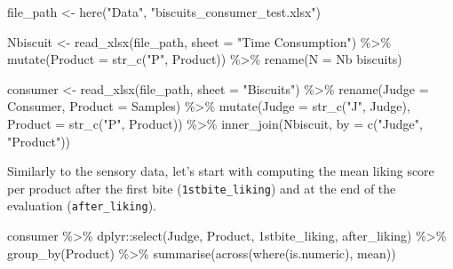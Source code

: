 \documentclass[
]{krantz}
\makeatletter
\newenvironment{Shaded}{\begin{snugshade}}{\end{snugshade}}
\newcommand{\AttributeTok}[1]{\textcolor[rgb]{0.61,0.61,0.61}{#1}}
\newcommand{\FunctionTok}[1]{\textcolor[rgb]{0,0,0}{#1}}
\newcommand{\NormalTok}[1]{#1}
\newcommand{\OtherTok}[1]{\textcolor[rgb]{0.37,0.37,0.37}{#1}}
\newcommand{\SpecialCharTok}[1]{\textcolor[rgb]{0,0,0}{#1}}
\newcommand{\StringTok}[1]{\textcolor[rgb]{0.5,0.5,0.5}{#1}}
\newenvironment{kframe}{%
\medskip{}
\setlength{\fboxsep}{.8em}
 \def\at@end@of@kframe{}%
 \ifinner\ifhmode%
  \def\at@end@of@kframe{\end{minipage}}%
  \begin{minipage}{\columnwidth}%
 \fi\fi%
 \def\FrameCommand##1{\hskip\@totalleftmargin \hskip-\fboxsep
 \colorbox{shadecolor}{##1}\hskip-\fboxsep
     \hskip-\linewidth \hskip-\@totalleftmargin \hskip\columnwidth}%
 \MakeFramed {\advance\hsize-\width
   \@totalleftmargin\z@ \linewidth\hsize
   \@setminipage}}%
 {\par\unskip\endMakeFramed%
 \at@end@of@kframe}
\renewenvironment{Shaded}{\begin{kframe}}{\end{kframe}}
\makeatother
\begin{document}
\begin{Shaded}
\begin{Highlighting}[]
\NormalTok{file\_path }\OtherTok{\textless{}{-}} \FunctionTok{here}\NormalTok{(}\StringTok{"Data"}\NormalTok{, }\StringTok{"biscuits\_consumer\_test.xlsx"}\NormalTok{)}

\NormalTok{Nbiscuit }\OtherTok{\textless{}{-}} \FunctionTok{read\_xlsx}\NormalTok{(file\_path, }\AttributeTok{sheet =} \StringTok{"Time Consumption"}\NormalTok{) }\SpecialCharTok{\%\textgreater{}\%}
  \FunctionTok{mutate}\NormalTok{(}\AttributeTok{Product =} \FunctionTok{str\_c}\NormalTok{(}\StringTok{"P"}\NormalTok{, Product)) }\SpecialCharTok{\%\textgreater{}\%}
  \FunctionTok{rename}\NormalTok{(}\AttributeTok{N =} \StringTok{\textasciigrave{}}\AttributeTok{Nb biscuits}\StringTok{\textasciigrave{}}\NormalTok{)}

\NormalTok{consumer }\OtherTok{\textless{}{-}} \FunctionTok{read\_xlsx}\NormalTok{(file\_path, }\AttributeTok{sheet =} \StringTok{"Biscuits"}\NormalTok{) }\SpecialCharTok{\%\textgreater{}\%}
  \FunctionTok{rename}\NormalTok{(}\AttributeTok{Judge =}\NormalTok{ Consumer, }\AttributeTok{Product =}\NormalTok{ Samples) }\SpecialCharTok{\%\textgreater{}\%}
  \FunctionTok{mutate}\NormalTok{(}\AttributeTok{Judge =} \FunctionTok{str\_c}\NormalTok{(}\StringTok{"J"}\NormalTok{, Judge), }\AttributeTok{Product =} \FunctionTok{str\_c}\NormalTok{(}\StringTok{"P"}\NormalTok{, Product)) }\SpecialCharTok{\%\textgreater{}\%}
  \FunctionTok{inner\_join}\NormalTok{(Nbiscuit, }\AttributeTok{by =} \FunctionTok{c}\NormalTok{(}\StringTok{"Judge"}\NormalTok{, }\StringTok{"Product"}\NormalTok{))}
\end{Highlighting}
\end{Shaded}

Similarly to the sensory data, let's start with computing the mean liking score per product after the first bite (\texttt{1stbite\_liking}) and at the end of the evaluation (\texttt{after\_liking}).

\begin{Shaded}
\begin{Highlighting}[]
\NormalTok{consumer }\SpecialCharTok{\%\textgreater{}\%}
\NormalTok{  dplyr}\SpecialCharTok{::}\FunctionTok{select}\NormalTok{(Judge, Product, }\StringTok{\textasciigrave{}}\AttributeTok{1stbite\_liking}\StringTok{\textasciigrave{}}\NormalTok{, }\StringTok{\textasciigrave{}}\AttributeTok{after\_liking}\StringTok{\textasciigrave{}}\NormalTok{) }\SpecialCharTok{\%\textgreater{}\%}
  \FunctionTok{group\_by}\NormalTok{(Product) }\SpecialCharTok{\%\textgreater{}\%}
  \FunctionTok{summarise}\NormalTok{(}\FunctionTok{across}\NormalTok{(}\FunctionTok{where}\NormalTok{(is.numeric), mean))}
\end{Highlighting}
\end{Shaded}
\end{document}
